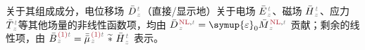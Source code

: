 关于其组成成分，电位移场 $\bar{D}^{\;\!\mathcolor{gray}{t}}_{\;\!\mathcolor{gray}{z}}$（直接/显示地）关于电场 $\bar{E}^{\;\!\mathcolor{gray}{t}}_{\;\!\mathcolor{gray}{z}}$、磁场 $\bar{H}^{\;\!\mathcolor{gray}{t}}_{\;\!\mathcolor{gray}{z}}$、应力 $\bar{T}^{\;\!\mathcolor{gray}{t}}_{\;\!\mathcolor{gray}{z}}$等其他场量的非线性函数项，均由 $\bar{D}^{\;\!\textcolor{Maroon}{\text{NL}}, \mathcolor{gray}{t}}_{\;\!\mathcolor{gray}{z}} = {\symup{\varepsilon}}_0 \bar{M}^{\;\!\textcolor{Maroon}{\text{NL}}, \mathcolor{gray}{t}}_{\;\!\mathcolor{gray}{z}}$ 贡献；剩余的线性项，由 $\bar{B}^{\;\!\textcolor{Maroon}{\text{(1)}} \mathcolor{gray}{t}}_{\;\!\mathcolor{gray}{z}} = \bar{\bar{\mu}}^{\;\!\textcolor{Maroon}{\text{(1)}} \mathcolor{gray}{t}}_{\;\!\mathcolor{gray}{z}}~\widetilde *~\bar{H}^{\;\!\mathcolor{gray}{t}}_{\;\!\mathcolor{gray}{z}}$ 表示。

